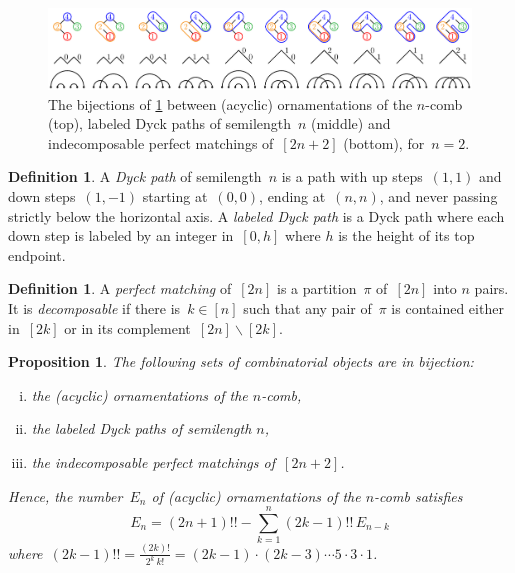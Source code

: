 \documentclass{amsart}
\newtheorem{proposition}[theorem]{Proposition}
\theoremstyle{definition}
\newtheorem{definition}[theorem]{Definition}
\newcommand{\ssm}{\smallsetminus} %
\newcommand{\darkblue}{\color{darkblue}} %
\newcommand{\defn}[1]{\textsl{\darkblue #1}} %
\begin{document}
\begin{figure}
	\centerline{\includegraphics[scale=.68]{comb}}
	\caption{The bijections of \cref{prop:comb} between (acyclic) ornamentations of the $n$-comb (top), labeled Dyck paths of semilength~$n$ (middle) and indecomposable perfect matchings of~$[2n+2]$ (bottom), for~$n = 2$.}
	\label{fig:comb}
\end{figure}

\begin{definition}
A \defn{Dyck path} of semilength~$n$ is a path with up steps~$(1,1)$ and down steps~$(1,-1)$ starting at~$(0,0)$, ending at~$(n,n)$, and never passing strictly below the horizontal axis.
A \defn{labeled Dyck path} is a Dyck path where each down step is labeled by an integer in~$[0,h]$ where $h$ is the height of its top endpoint.
\end{definition}

\begin{definition}
A \defn{perfect matching} of~$[2n]$ is a partition~$\pi$ of~$[2n]$ into $n$ pairs.
It is \defn{decomposable} if there is~$k \in [n]$ such that any pair of~$\pi$ is contained either in~$[2k]$ or in its complement~$[2n] \ssm [2k]$.
\end{definition}

\begin{proposition}
\label{prop:comb}
The following sets of combinatorial objects are in bijection:
\begin{enumerate}[(i)]
\item the (acyclic) ornamentations of the $n$-comb,
\item the labeled Dyck paths of semilength $n$,
\item the indecomposable perfect matchings of~$[2n+2]$.
\end{enumerate}
Hence, the number~$E_n$ of (acyclic) ornamentations of the $n$-comb satisfies
\[
E_n = (2n+1)!! - \sum_{k = 1}^n (2k-1)!! \, E_{n-k}
\]
where~$\displaystyle(2k-1)!! = \frac{(2k)!}{2^k \, k!} = (2k-1) \cdot (2k-3) \cdots 5 \cdot 3 \cdot 1$.
\end{proposition}
\end{document}
